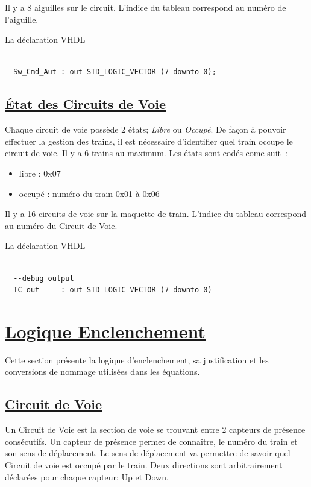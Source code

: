 Il y a 8 aiguilles sur le circuit. L'indice du tableau correspond au
numéro de l'aiguille.

\medskip
La déclaration VHDL
\begin{lstlisting}[style=vhdl]

  Sw_Cmd_Aut : out STD_LOGIC_VECTOR (7 downto 0);

\end{lstlisting}


  
\subsection{\underline{\'Etat des Circuits de Voie}}
\label{sec:st_sig}

Chaque circuit de voie possède 2 états; \emph{Libre} ou
\emph{Occupé}. De façon à pouvoir effectuer la gestion des trains, il
est nécessaire d'identifier quel train occupe le circuit de voie.  Il
y a 6 trains au maximum. Les états sont codés come suit~:
\begin{itemize}
  \item libre : 0x07
  \item occupé : numéro du train 0x01 à 0x06
\end{itemize}  

Il y a 16 circuits de voie sur la maquette de train. L'indice du
tableau correspond au numéro du Circuit de Voie.

\medskip
La déclaration VHDL
\begin{lstlisting}[style=vhdl]

  --debug output
  TC_out     : out STD_LOGIC_VECTOR (7 downto 0)

\end{lstlisting}




\newpage
\section{\underline{Logique Enclenchement}}
\label{sec:log_enc}

Cette section présente la logique d'enclenchement, sa justification et
les conversions de nommage utilisées dans les équations.

\subsection{\underline{Circuit de Voie}}
\label{sec:CdV}

Un Circuit de Voie est la section de voie se trouvant entre 2 capteurs
de présence consécutifs. Un capteur de présence permet de
connaître, le numéro du train et son sens de déplacement. Le sens de
déplacement va permettre de savoir quel Circuit de voie est occupé par le
train. Deux directions sont arbitrairement déclarées pour chaque
capteur; Up et Down.

